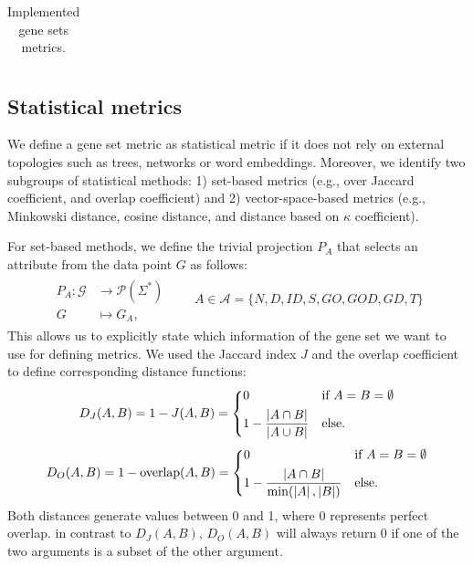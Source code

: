 \documentclass{thesisclass}
\DeclareMathOperator{\overlap}{overlap}
\DeclareMathOperator{\wToV}{w2v}
\begin{document}
\begin{table}[!ht]
\begin{tabularx}{\linewidth}{l|X}
		\hline
	\end{tabularx}
	\caption{Implemented gene sets metrics.}
	\label{fig:metrics}
\end{table}

\subsection{Statistical metrics}

We define a gene set metric as statistical metric if it does not rely on external topologies such as trees, networks or word embeddings. Moreover, we identify two subgroups of statistical methods: 1) set-based metrics (e.g., over Jaccard coefficient, and overlap coefficient) and 2) vector-space-based metrics (e.g., Minkowski distance, cosine distance, and distance based on $\kappa$ coefficient).

For set-based methods, we define the trivial projection $P_A$ that selects an attribute from the data point $G$ as follows:
\begin{align} \label{eq:trivial_projection}
	\begin{split}
		P_A : \mathcal{G} & \to \mathcal{P}(\Sigma^*) \\
		G & \mapsto  G_A,
	\end{split} \qquad A \in \mathcal{A} = \lbrace{ N,D, ID, S,GO, GOD, GD,T \rbrace}
\end{align}
This allows us to explicitly state which information of the gene set we want to use for defining metrics.
We used the Jaccard index $J$ and the overlap coefficient~\cite{Vijaymeena} to define corresponding distance functions:
\begin{align}
	D_J(A,B) = 1-J(A,B) =\begin{dcases}
			0 & \text{if } A=B=\emptyset \\
			1 - \frac{\left| A \cap B \right|}{\left| A \cup B \right|}  &\text{else}.
		\end{dcases}
\end{align}
\begin{align}
	D_O(A,B) = 1- \overlap(A,B) = \begin{dcases}
					0 & \text{if } A=B=\emptyset \\
					1 - \frac{\left| A \cap B \right|}{\min(\left| A \right|, \left| B \right|)} &\text{else}.
				\end{dcases}
\end{align}
Both distances generate values between 0 and 1, where 0 represents perfect overlap. in contrast to $D_J(A,B)$, $D_O(A,B)$ will always return 0 if one of the two arguments is a subset of the other argument.
\end{document}
